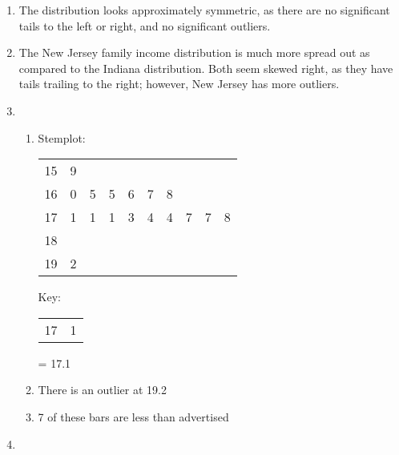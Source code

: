 \documentclass[12pt]{article}
\begin{document}
\begin{enumerate}
\begin{enumerate}
    \end{enumerate}

    \setcounter{enumi}{48}

  \item The distribution looks approximately symmetric, as there are no significant tails to the left or right, and no significant outliers.

    \setcounter{enumi}{54}

  \item The New Jersey family income distribution is much more spread out as compared to the Indiana distribution. Both seem skewed right, as they have tails trailing to the right; however, New Jersey has more outliers. 

    \setcounter{enumi}{58}

  \item

    \begin{enumerate}

      \item Stemplot:
        
        \begin{center}
          \begin{tabular}{r | l l l l l l l l l} 15 & 9 & & & &  & & & &\\ 16 & 0 & 5 & 5 & 6 & 7 & 8 & & & \\ 17 & 1 & 1 & 1 & 3 & 4 & 4 & 7 & 7 & 8\\ 18 & & & & & & & & &\\ 19 & 2 & & & & & & & & \end{tabular}
        \end{center}
        
        \begin{flushright}
          \hfill Key:\newline
          \begin{tabular}{r | l} 17 & 1 \end{tabular} = 17.1
        \end{flushright}

      \item There is an outlier at 19.2

      \item 7 of these bars are less than advertised

    \end{enumerate}

    \setcounter{enumi}{62}

  \item


\end{enumerate}
\end{document}
